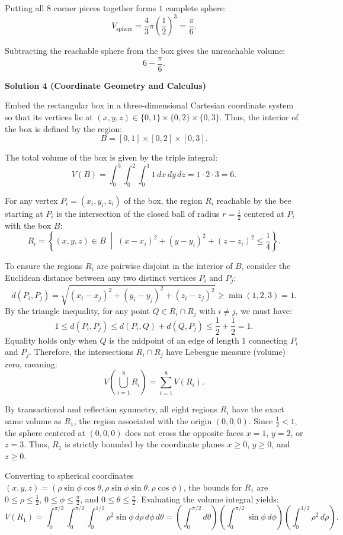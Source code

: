 \begin{enumerate}
 Putting all $8$ corner pieces together forms $1$ complete sphere:
 \[V_{\text{sphere}} = \frac{4}{3}\pi \left(\frac{1}{2}\right)^3 = \frac{\pi}{6}.\]

 Subtracting the reachable sphere from the box gives the unreachable volume:
 \[6 - \frac{\pi}{6}.\]




\textbf{Solution 4 (Coordinate Geometry and Calculus)}

Embed the rectangular box in a three-dimensional Cartesian coordinate system so that its vertices lie at $(x, y, z) \in \{0, 1\} \times \{0, 2\} \times \{0, 3\}$. Thus, the interior of the box is defined by the region:
 \[B = [0,1] \times [0,2] \times [0,3].\]

 The total volume of the box is given by the triple integral:
 \[V(B) = \int_0^3 \int_0^2 \int_0^1 1 \, dx \, dy \, dz = 1 \cdot 2 \cdot 3 = 6.\]

 For any vertex $P_i = (x_i, y_i, z_i)$ of the box, the region $R_i$ reachable by the bee starting at $P_i$ is the intersection of the closed ball of radius $r = \frac{1}{2}$ centered at $P_i$ with the box $B$:
 \[R_i = \left\{ (x, y, z) \in B \;\middle|\; (x - x_i)^2 + (y - y_i)^2 + (z - z_i)^2 \leq \frac{1}{4} \right\}.\]

 To ensure the regions $R_i$ are pairwise disjoint in the interior of $B$, consider the Euclidean distance between any two distinct vertices $P_i$ and $P_j$:
 \[d(P_i, P_j) = \sqrt{(x_i - x_j)^2 + (y_i - y_j)^2 + (z_i - z_j)^2} \geq \min(1, 2, 3) = 1.\]By the triangle inequality, for any point $Q \in R_i \cap R_j$ with $i \neq j$, we must have:
 \[1 \leq d(P_i, P_j) \leq d(P_i, Q) + d(Q, P_j) \leq \frac{1}{2} + \frac{1}{2} = 1.\]Equality holds only when $Q$ is the midpoint of an edge of length $1$ connecting $P_i$ and $P_j$. Therefore, the intersections $R_i \cap R_j$ have Lebesgue measure (volume) zero, meaning:
 \[V\left(\bigcup_{i=1}^8 R_i\right) = \sum_{i=1}^8 V(R_i).\]

 
By transactional and reflection symmetry, all eight regions $R_i$ have the exact same volume as $R_1$, the region associated with the origin $(0,0,0)$. Since $\frac{1}{2} < 1$, the sphere centered at $(0,0,0)$ does not cross the opposite faces $x=1$, $y=2$, or $z=3$. Thus, $R_1$ is strictly bounded by the coordinate planes $x \geq 0$, $y \geq 0$, and $z \geq 0$.

 Converting to spherical coordinates $(x, y, z) = (\rho \sin\phi \cos\theta, \rho \sin\phi \sin\theta, \rho \cos\phi)$, the bounds for $R_1$ are $0 \leq \rho \leq \frac{1}{2}$, $0 \leq \phi \leq \frac{\pi}{2}$, and $0 \leq \theta \leq \frac{\pi}{2}$. Evaluating the volume integral yields:
 \[V(R_1) = \int_0^{\pi/2} \int_0^{\pi/2} \int_0^{1/2} \rho^2 \sin\phi \, d\rho \, d\phi \, d\theta = \left(\int_0^{\pi/2} d\theta\right) \left(\int_0^{\pi/2} \sin\phi \, d\phi\right) \left(\int_0^{1/2} \rho^2 \, d\rho\right).\]


\end{enumerate}
